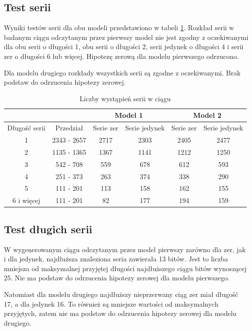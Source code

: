 \subsection{Test serii}

Wyniki testów serii dla obu modeli przedstawiono w tabeli \ref{serieTabela}. Rozkład serii w badanym ciągu odczytanym
przez pierwszy model nie jest zgodny z oczekiwanymi dla obu serii o długości 1, obu serii o długości 2, serii jedynek 
o długości 4 i serii zer o długości 6 lub więcej. Hipotezę zerową dla modelu pierwszego odrzucono.

Dla modelu drugiego rozkłady wszystkich serii są zgodne z oczekiwanymi. Brak podstaw do odrzucenia hipotezy zerowej.
\begin{table}[H]
    \centering
    \caption{Liczby wystąpień serii w ciągu}
    \label{serieTabela}
    \begin{tabular}{|c|c|c|c|c|c|} 
        \hline
        \multicolumn{2}{|c|}{} & \multicolumn{2}{c|}{Model 1} & \multicolumn{2}{c|}{Model 2} \\
        \hline
        Długość serii & Przedział & Serie zer & Serie jedynek & Serie zer & Serie jedynek \\
        \hline
        1 & 2343 - 2657 & 2717 & 2303 & 2405 & 2477 \\
        \hline
        2 & 1135 - 1365 & 1367 & 1141 & 1212 & 1250 \\
        \hline
        3 & 542 - 708 & 559 & 678 & 612 & 593 \\
        \hline
        4 & 251 - 373 & 263 & 374 & 338 & 290 \\
        \hline
        5 & 111 - 201 & 113 & 158 & 162 & 155 \\
        \hline
        6 i więcej & 111 - 201 & 82 & 177 & 194 & 159 \\
        \hline  
    \end{tabular} 
\end{table}   

\subsection{Test długich serii}
W wygenerowanym ciągu odczytanym przez model pierwszy zarówno dla zer, jak i dla jedynek, najdłuższa znaleziona seria 
zawierała 13 bitów. Jest to liczba mniejsza od maksymalnej przyjętej długości najdłuższego ciągu bitów wynoszącej 25. 
Nie ma podstaw do odrzucenia hipotezy zerowej dla modelu pierwszego. \par
Natomiast dla modelu drugiego najdłuższy nieprzerwany ciąg zer miał długość 17, a dla jedynek 16. To również są 
mniejsze wartości od maksymalnych przyjętych, zatem nie ma podstaw do odrzucenia hipotezy zerowej dla modelu drugiego.


